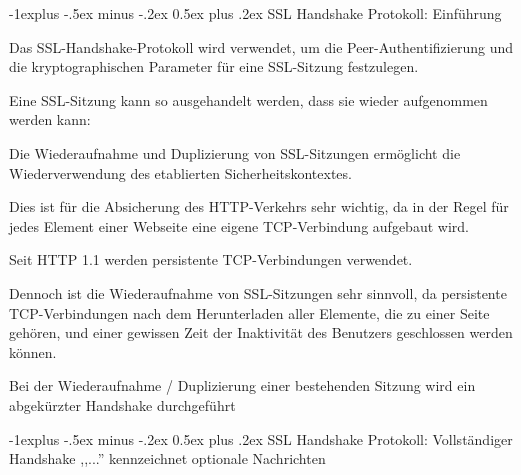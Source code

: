 \documentclass[a4paper]{article}
\makeatletter
\renewcommand{\subsection}{\@startsection{subsection}{2}{0mm}%
 {-1explus -.5ex minus -.2ex}%
 {0.5ex plus .2ex}%
 {\normalfont\normalsize\bfseries}}
\makeatother
\begin{document}
\begin{multicols}{3}
      \subsection{SSL Handshake Protokoll: Einführung}
      \begin{itemize*}
            \item Das SSL-Handshake-Protokoll wird verwendet, um die Peer-Authentifizierung und die kryptographischen Parameter für eine SSL-Sitzung festzulegen.
            \item Eine SSL-Sitzung kann so ausgehandelt werden, dass sie wieder aufgenommen werden kann:
            \begin{itemize*}
                  \item Die Wiederaufnahme und Duplizierung von SSL-Sitzungen ermöglicht die Wiederverwendung des etablierten Sicherheitskontextes.
                  \item Dies ist für die Absicherung des HTTP-Verkehrs sehr wichtig, da in der Regel für jedes Element einer Webseite eine eigene TCP-Verbindung aufgebaut wird.
                  \begin{itemize*}
                        \item Seit HTTP 1.1 werden persistente TCP-Verbindungen verwendet.
                        \item Dennoch ist die Wiederaufnahme von SSL-Sitzungen sehr sinnvoll, da persistente TCP-Verbindungen nach dem Herunterladen aller Elemente, die zu einer Seite gehören, und einer gewissen Zeit der Inaktivität des Benutzers geschlossen werden können.
                  \end{itemize*}
                  \item Bei der Wiederaufnahme / Duplizierung einer bestehenden Sitzung wird ein abgekürzter Handshake durchgeführt
            \end{itemize*}
      \end{itemize*}

      \subsection{SSL Handshake Protokoll: Vollständiger Handshake}
      ,,...'' kennzeichnet optionale Nachrichten


\end{multicols}
\end{document}
